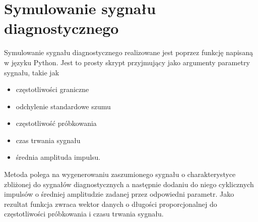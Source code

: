 \documentclass[inzynierska]{pwr_wmat_praca_dyplomowa}
\theoremstyle{plain}
\numberwithin{theorem}{chapter}
\theoremstyle{definition}
\numberwithin{theorem}{chapter}
\begin{document}
\section{Symulowanie sygnału diagnostycznego}
Symulowanie sygnału diagnostycznego realizowane jest poprzez funkcję napisaną w języku Python. Jest to prosty skrypt przyjmujący jako argumenty parametry sygnału, takie jak 
\begin{itemize}
	\item częstotliwości graniczne
	\item odchylenie standardowe szumu
	\item częstotliwość próbkowania
	\item czas trwania sygnału
	\item średnia amplituda impulsu.
\end{itemize}
Metoda polega na wygenerowaniu zaszumionego sygnału o charakterystyce zbliżonej do sygnałów diagnostycznych a następnie dodaniu do niego cyklicznych impulsów o średniej amplitudzie zadanej przez odpowiedni parametr. 
Jako rezultat funkcja zwraca wektor danych o długości proporcjonalnej do częstotliwości próbkowania i czasu trwania sygnału.
\end{document}

